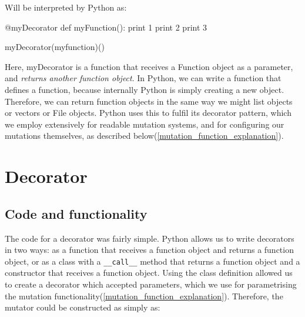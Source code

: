 Will be interpreted by Python as: 
\begin{pyglist}[language = python, encoding = utf8, caption = {How Python interprets a decorated function call}, listingname=\textbf{Code Sample}, numbers=left]
@myDecorator
def myFunction():
  print 1
  print 2
  print 3
  
myDecorator(myfunction)()
\end{pyglist} \par
Here, myDecorator is a function that receives a Function object as a parameter, and \emph{returns another function object}. In Python, we can write a function that defines a function, because internally Python is simply creating a new object. Therefore, we can return function objects in the same way we might list objects or vectors or File objects. Python uses this to fulfil its decorator pattern, which we employ extensively for readable mutation systems, and for configuring our mutations themselves, as described below(\cref{mutation_function_explanation}). \par

\section{Decorator}
\subsection{Code and functionality}
The code for a decorator was fairly simple. Python allows us to write decorators in two ways: as a function that receives a function object and returns a function object, or as a class with a \texttt{\_\_call\_\_} method that returns a function object and a constructor that receives a function object. Using the class definition allowed us to create a decorator which accepted parameters, which we use for parametrising the mutation functionality(\cref{mutation_function_explanation}). Therefore, the mutator could be constructed as simply as:

